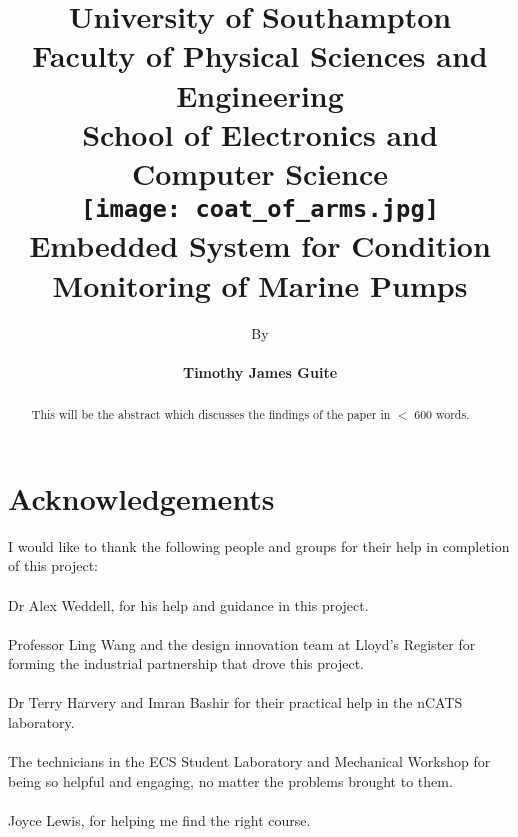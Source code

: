 \documentclass[12pt, twoside]{report}
\title{\vspace{-10ex}
	{\small University of Southampton}\\
	{\small Faculty of Physical Sciences and Engineering}\\
	{\small School of Electronics and Computer Science}\\
	[2cm]
	{\texttt{[image: coat\_of\_arms.jpg]}}\\[2cm]
	\textbf{{Embedded System for Condition Monitoring of Marine Pumps}}}
\author{By\\ \\
	\textbf{Timothy James Guite}}
\date{\parbox{\linewidth}{\centering%
  \today\endgraf\bigskip
  Supervisor: Dr Alex Weddell\\
Second Examiner: Dr Frederic Gardes\endgraf\bigskip
A dissertation submitted in partial fulfillment of the degree of \\
\textbf{MSc Embedded Systems}}}
\begin{document}

\maketitle

\maketitle

\begin{abstract}

This will be the abstract which discusses the findings of the paper in $<$ 600 words.

\end{abstract}

\chapter*{Acknowledgements}

I would like to thank the following people and groups for their help in completion of this project:\\
\\
Dr Alex Weddell, for his help and guidance in this project.\\
\\
Professor Ling Wang and the design innovation team at Lloyd's Register for forming the industrial partnership that drove this project.\\
\\
Dr Terry Harvery and Imran Bashir for their practical help in the nCATS laboratory.\\
\\
The technicians in the ECS Student Laboratory and Mechanical Workshop for being so helpful and engaging, no matter the problems brought to them.\\
\\
Joyce Lewis, for helping me find the right course.




\tableofcontents

\listoffigures



 


















\end{document}

